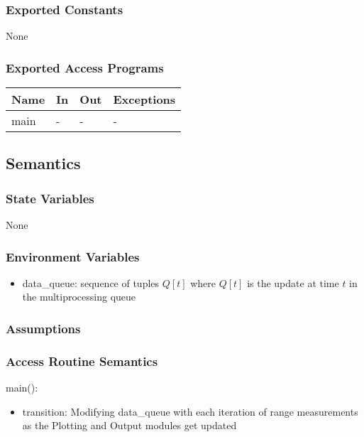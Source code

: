 \documentclass[12pt, titlepage]{article}
\begin{document}
\subsubsection{Exported Constants}
None

\subsubsection{Exported Access Programs}

\begin{center}
\begin{tabular}{p{2cm} p{4cm} p{4cm} p{2cm}}
\hline
\textbf{Name} & \textbf{In} & \textbf{Out} & \textbf{Exceptions} \\
\hline
main& - & - & - \\
\hline
\end{tabular}
\end{center}

\subsection{Semantics}

\subsubsection{State Variables}
None

\subsubsection{Environment Variables}
\begin{itemize}
  \item data\_queue: sequence of tuples \( Q[t] \) where \( Q[t] \) is the update at time \( t \) in the multiprocessing queue 
\end{itemize}

\subsubsection{Assumptions}

  
\subsubsection{Access Routine Semantics}

\noindent main():
\begin{itemize}
\item transition: Modifying data\_queue with each iteration of range measurements as the Plotting and Output modules get updated 
\end{itemize}
\end{document}
